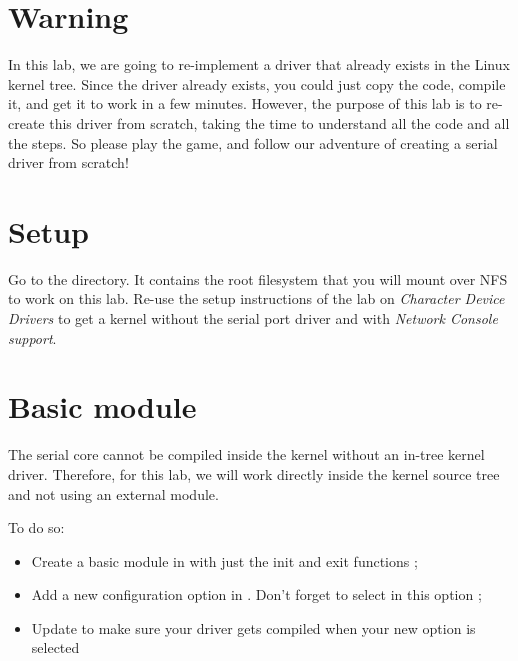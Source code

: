
\section{Warning}

In this lab, we are going to re-implement a driver that already exists
in the Linux kernel tree. Since the driver already exists, you could
just copy the code, compile it, and get it to work in a few
minutes. However, the purpose of this lab is to re-create this driver
from scratch, taking the time to understand all the code and all the
steps. So please play the game, and follow our adventure of creating a
serial driver from scratch!

\section{Setup}

Go to the  directory. It
contains the root filesystem that you will mount over NFS to work on
this lab. Re-use the setup instructions of the lab on {\em Character
Device Drivers} to get a kernel without the serial port driver and
with {\em Network Console support}.

\section{Basic module}

The serial core cannot be compiled inside the kernel without an
in-tree kernel driver. Therefore, for this lab, we will work directly
inside the kernel source tree and not using an external module.

To do so:

\begin{itemize}

\item Create a basic module in  with
  just the init and exit functions ;

\item Add a new configuration option in
  . Don't forget to select
   in this option ;

\item Update  to make sure your
  driver gets compiled when your new option is selected

\end{itemize}

